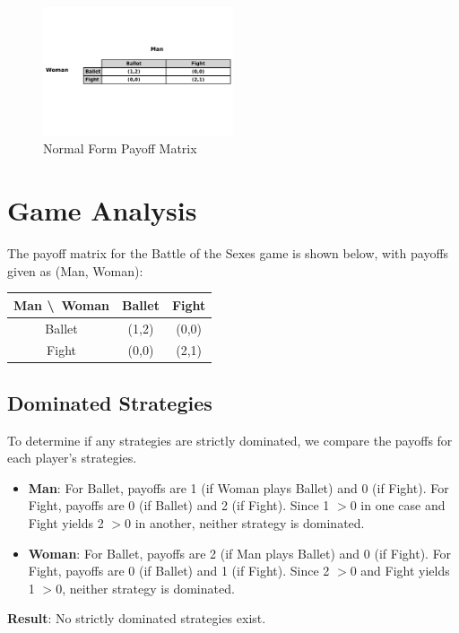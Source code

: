 \documentclass[a4paper,12pt]{article}
\begin{document}
\begin{figure}[H]
\centering
\includegraphics[width=0.5\textwidth]{payoff_table.png}
\caption{Normal Form Payoff Matrix}
\end{figure}
\section{Game Analysis}
The payoff matrix for the Battle of the Sexes game is shown below, with payoffs given as (Man, Woman):

\begin{center}
\begin{tabular}{c|cc}
\toprule
Man \textbackslash\ Woman & Ballet & Fight \\
\midrule
Ballet & (1,2) & (0,0) \\
Fight & (0,0) & (2,1) \\
\bottomrule
\end{tabular}
\end{center}

\subsection{Dominated Strategies}
To determine if any strategies are strictly dominated, we compare the payoffs for each player's strategies.

\begin{itemize}
\item \textbf{Man}: For Ballet, payoffs are 1 (if Woman plays Ballet) and 0 (if Fight). For Fight, payoffs are 0 (if Ballet) and 2 (if Fight). Since 1 $> 0$ in one case and Fight yields 2 $> 0$ in another, neither strategy is dominated.
\item \textbf{Woman}: For Ballet, payoffs are 2 (if Man plays Ballet) and 0 (if Fight). For Fight, payoffs are 0 (if Ballet) and 1 (if Fight). Since 2 $> 0$ and Fight yields 1 $> 0$, neither strategy is dominated.
\end{itemize}

\textbf{Result}: No strictly dominated strategies exist.
\end{document}
